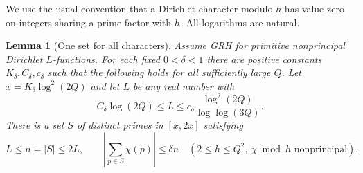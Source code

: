 \documentclass[11pt]{article}
\newtheorem{lemma}[theorem]{Lemma}
\begin{document}
We use the usual convention that a Dirichlet character modulo $h$ has value
zero on integers sharing a prime factor with $h$. All logarithms are natural.

\begin{lemma}[One set for all characters]\label{lem:smallbias}
Assume GRH for primitive nonprincipal Dirichlet $L$-functions.
For each fixed $0<\delta<1$ there are positive constants
$K_\delta,C_\delta,c_\delta$ such that the following holds for all
sufficiently large $Q$. Let $x=K_\delta\log^2(2Q)$ and let $L$ be any
real number with
\[
 C_\delta\log(2Q)\leq L\leq
 c_\delta\frac{\log^2(2Q)}{\log\log(3Q)} .
\]
There is a set $S$ of distinct primes in $[x,2x]$ satisfying
\[
 L\leq n=|S|\leq 2L,\qquad
 \left|\sum_{p\in S}\chi(p)\right|\leq\delta n
 \quad(2\leq h\leq Q^2,\ \chi\bmod h\text{ nonprincipal}).
\]
\end{lemma}
\end{document}
